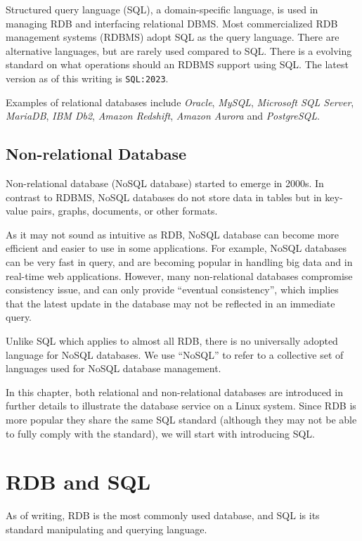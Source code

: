 Structured query language (SQL), a domain-specific language, is used in managing RDB and interfacing relational DBMS.  Most commercialized RDB management systems (RDBMS) adopt SQL as the query language. There are alternative languages, but are rarely used compared to SQL. There is a evolving standard on what operations should an RDBMS support using SQL. The latest version as of this writing is \verb|SQL:2023|.

Examples of relational databases include \textit{Oracle}, \textit{MySQL}, \textit{Microsoft SQL Server}, \textit{MariaDB}, \textit{IBM Db2}, \textit{Amazon Redshift}, \textit{Amazon Aurora} and \textit{PostgreSQL}.

\subsection{Non-relational Database}

Non-relational database (NoSQL database) started to emerge in 2000s. In contrast to RDBMS, NoSQL databases do not store data in tables but in key-value pairs, graphs, documents, or other formats.

As it may not sound as intuitive as RDB, NoSQL database can become more efficient and easier to use in some applications. For example, NoSQL databases can be very fast in query, and are becoming popular in handling big data and in real-time web applications. However, many non-relational databases compromise consistency issue, and can only provide ``eventual consistency'', which implies that the latest update in the database may not be reflected in an immediate query.

Unlike SQL which applies to almost all RDB, there is no universally adopted language for NoSQL databases. We use ``NoSQL'' to refer to a collective set of languages used for NoSQL database management.

In this chapter, both relational and non-relational databases are introduced in further details to illustrate the database service on a Linux system. Since RDB is more popular they share the same SQL standard (although they may not be able to fully comply with the standard), we will start with introducing SQL.

\section{RDB and SQL}

As of writing, RDB is the most commonly used database, and SQL is its standard manipulating and querying language.

